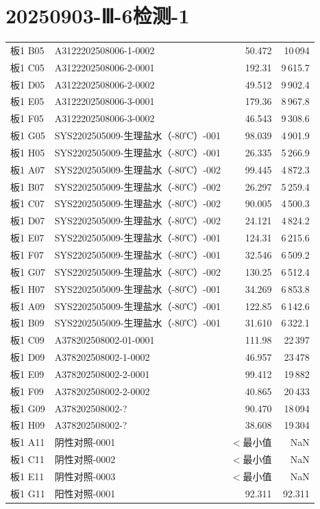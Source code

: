 \documentclass[UTF8,10pt,a4paper,fontset=fandol]{ctexart}
\begin{document}
\newpage

\section*{20250903-Ⅲ-6检测-1}

\begin{small}
\begin{tabular}{@{}p{1.1cm}p{6.0cm}r@{\hspace{1.2cm}}r@{}}
板1 B05 & A3122202508006-1-0002 & 50.472 & 10\,094 \\
板1 C05 & A3122202508006-2-0001 & 192.31 & 9\,615.7 \\
板1 D05 & A3122202508006-2-0002 & 49.512 & 9\,902.4 \\
板1 E05 & A3122202508006-3-0001 & 179.36 & 8\,967.8 \\
板1 F05 & A3122202508006-3-0002 & 46.543 & 9\,308.6 \\
板1 G05 & SYS2202505009-生理盐水（-80℃）-001 & 98.039 & 4\,901.9 \\
板1 H05 & SYS2202505009-生理盐水（-80℃）-001 & 26.335 & 5\,266.9 \\
板1 A07 & SYS2202505009-生理盐水（-80℃）-002 & 99.445 & 4\,872.3 \\
板1 B07 & SYS2202505009-生理盐水（-80℃）-002 & 26.297 & 5\,259.4 \\
板1 C07 & SYS2202505009-生理盐水（-80℃）-002 & 90.005 & 4\,500.3 \\
板1 D07 & SYS2202505009-生理盐水（-80℃）-002 & 24.121 & 4\,824.2 \\
板1 E07 & SYS2202505009-生理盐水（-80℃）-001 & 124.31 & 6\,215.6 \\
板1 F07 & SYS2202505009-生理盐水（-80℃）-001 & 32.546 & 6\,509.2 \\
板1 G07 & SYS2202505009-生理盐水（-80℃）-002 & 130.25 & 6\,512.4 \\
板1 H07 & SYS2202505009-生理盐水（-80℃）-001 & 34.269 & 6\,853.8 \\
板1 A09 & SYS2202505009-生理盐水（-80℃）-001 & 122.85 & 6\,142.6 \\
板1 B09 & SYS2202505009-生理盐水（-80℃）-001 & 31.610 & 6\,322.1 \\
板1 C09 & A378202508002-01-0001 & 111.98 & 22\,397 \\
板1 D09 & A378202508002-1-0002 & 46.957 & 23\,478 \\
板1 E09 & A378202508002-2-0001 & 99.412 & 19\,882 \\
板1 F09 & A378202508002-2-0002 & 40.865 & 20\,433 \\
板1 G09 & A378202508002-? & 90.470 & 18\,094 \\
板1 H09 & A378202508002-? & 38.608 & 19\,304 \\
板1 A11 & 阴性对照-0001 & $<$最小值 & NaN \\
板1 C11 & 阴性对照-0002 & $<$最小值 & NaN \\
板1 E11 & 阴性对照-0003 & $<$最小值 & NaN \\
板1 G11 & 阳性对照-0001 & 92.311 & 92.311 \\
\end{tabular}
\end{small}
\end{document}
